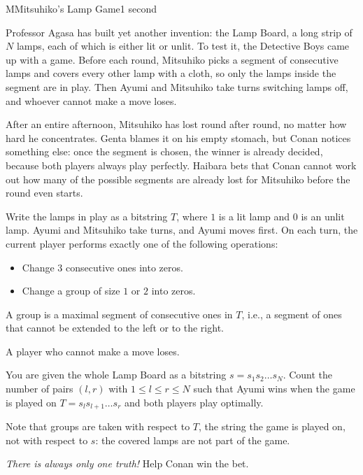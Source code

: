 \begin{problem}{M}{Mitsuhiko's Lamp Game}{1 second}

\noindent
Professor Agasa has built yet another invention: the Lamp Board, a long strip of $N$ lamps, each of which is either lit or unlit. To test it, the Detective Boys came up with a game. Before each round, Mitsuhiko picks a segment of consecutive lamps and covers every other lamp with a cloth, so only the lamps inside the segment are in play. Then Ayumi and Mitsuhiko take turns switching lamps off, and whoever cannot make a move loses.

\noindent
After an entire afternoon, Mitsuhiko has lost round after round, no matter how hard he concentrates. Genta blames it on his empty stomach, but Conan notices something else: once the segment is chosen, the winner is already decided, because both players always play perfectly. Haibara bets that Conan cannot work out how many of the possible segments are already lost for Mitsuhiko before the round even starts.

\noindent
Write the lamps in play as a bitstring $T$, where $1$ is a lit lamp and $0$ is an unlit lamp. Ayumi and Mitsuhiko take turns, and Ayumi moves first. On each turn, the current player performs exactly one of the following operations:

\begin{itemize}
\item Change $3$ consecutive ones into zeros.
\item Change a group of size $1$ or $2$ into zeros.
\end{itemize}

\noindent
A group is a maximal segment of consecutive ones in $T$, i.e., a segment of ones that cannot be extended to the left or to the right.

\noindent
A player who cannot make a move loses.

\noindent
You are given the whole Lamp Board as a bitstring $s = s_1 s_2 \ldots s_N$. Count the number of pairs $(l, r)$ with $1 \le l \le r \le N$ such that Ayumi wins when the game is played on $T = s_l s_{l+1} \ldots s_r$ and both players play optimally.

\noindent
Note that groups are taken with respect to $T$, the string the game is played on, not with respect to $s$: the covered lamps are not part of the game.

\noindent
\textit{There is always only one truth!} Help Conan win the bet.

\InputFile


\end{problem}
